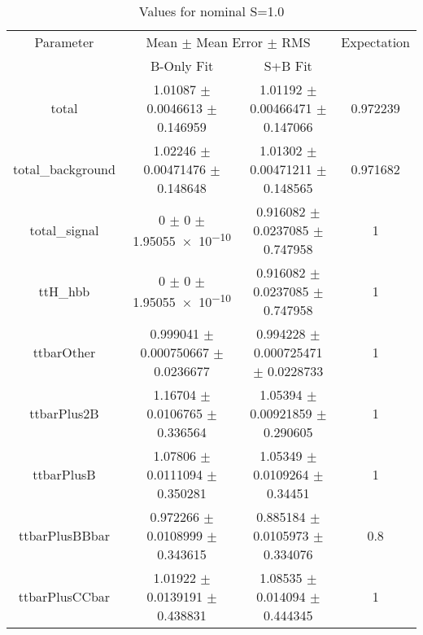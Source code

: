 \begin{table}
\centering
\caption{Values for nominal S=1.0}
\begin{tabular}{cccc}
\toprule
Parameter & \multicolumn{2}{c}{Mean $\pm$ Mean Error $\pm$ RMS} & Expectation\\
 & B-Only Fit & S+B Fit & \\
\midrule
total & \num{1.01087} $\pm$ \num{0.0046613} $\pm$ \num{0.146959} & \num{1.01192} $\pm$ \num{0.00466471} $\pm$ \num{0.147066} & \num{0.972239}\\
total\_background & \num{1.02246} $\pm$ \num{0.00471476} $\pm$ \num{0.148648} & \num{1.01302} $\pm$ \num{0.00471211} $\pm$ \num{0.148565} & \num{0.971682}\\
total\_signal & \num{0} $\pm$ \num{0} $\pm$ \num{1.95055e-10} & \num{0.916082} $\pm$ \num{0.0237085} $\pm$ \num{0.747958} & \num{1}\\
ttH\_hbb & \num{0} $\pm$ \num{0} $\pm$ \num{1.95055e-10} & \num{0.916082} $\pm$ \num{0.0237085} $\pm$ \num{0.747958} & \num{1}\\
ttbarOther & \num{0.999041} $\pm$ \num{0.000750667} $\pm$ \num{0.0236677} & \num{0.994228} $\pm$ \num{0.000725471} $\pm$ \num{0.0228733} & \num{1}\\
ttbarPlus2B & \num{1.16704} $\pm$ \num{0.0106765} $\pm$ \num{0.336564} & \num{1.05394} $\pm$ \num{0.00921859} $\pm$ \num{0.290605} & \num{1}\\
ttbarPlusB & \num{1.07806} $\pm$ \num{0.0111094} $\pm$ \num{0.350281} & \num{1.05349} $\pm$ \num{0.0109264} $\pm$ \num{0.34451} & \num{1}\\
ttbarPlusBBbar & \num{0.972266} $\pm$ \num{0.0108999} $\pm$ \num{0.343615} & \num{0.885184} $\pm$ \num{0.0105973} $\pm$ \num{0.334076} & \num{0.8}\\
ttbarPlusCCbar & \num{1.01922} $\pm$ \num{0.0139191} $\pm$ \num{0.438831} & \num{1.08535} $\pm$ \num{0.014094} $\pm$ \num{0.444345} & \num{1}\\
\bottomrule
\end{tabular}
\end{table}